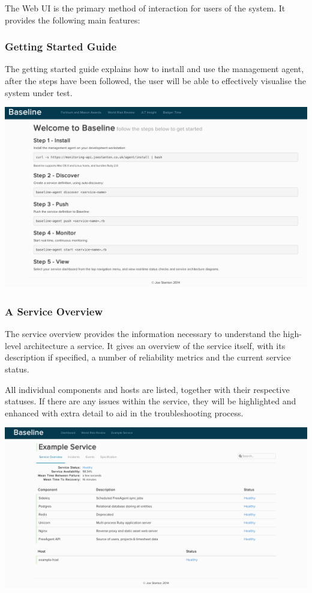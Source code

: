 \documentclass{cshonours}
\begin{document}
The Web UI is the primary method of interaction for users of the system. It provides the following main features:

\subsubsection{Getting Started Guide}

The getting started guide explains how to install and use the management agent, after the steps have been followed, the user will be able to effectively visualise the system under test.

\begin{center}
  \includegraphics[scale=0.28]{web-ui/getting-started.png}
\end{center}

\subsubsection{A Service Overview}

The service overview provides the information necessary to understand the high-level architecture a service. It gives an overview of the service itself, with its description if specified, a number of reliability metrics and the current service status.

All individual components and hosts are listed, together with their respective statuses. If there are any issues within the service, they will be highlighted and enhanced with extra detail to aid in the troubleshooting process.

\begin{center}
  \label{webui-overview}
  \includegraphics[scale=0.28]{web-ui/service-overview.png}
\end{center}
\end{document}
